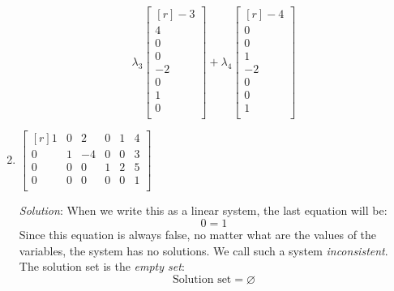 \documentclass[12pt]{article}
\begin{document}
\begin{enumerate}
\[\lambda_3
\begin{bmatrix*}[r]  -3\\   4\\   0\\   0\\  -2\\   0\\   1\\   0\\\end{bmatrix*}+ 
\lambda_4
\begin{bmatrix*}[r]  -4\\   0\\   0\\   1\\  -2\\   0\\   0\\   1\\\end{bmatrix*} 
\]
\proofend

\bigskip
\item
$\begin{bmatrix*}[r]
1 & 0 &  2 & 0 & 1 & 4\\
0 & 1 & -4 & 0 & 0 & 3\\
0 & 0 &  0 & 1 & 2 & 5\\
0 & 0 &  0 & 0 & 0 & 1\\
\end{bmatrix*}$

\emph{Solution}:
When we write this as a linear system, the last equation will be:
\[
0=1
\]
Since this equation is always false, no matter what are the values of the variables, the system has no solutions. We call such a system \emph{inconsistent}. The solution set is the \emph{empty set}:
\[
\text{Solution set}=\varnothing
\]
\proofend




\end{enumerate}
\end{document}
